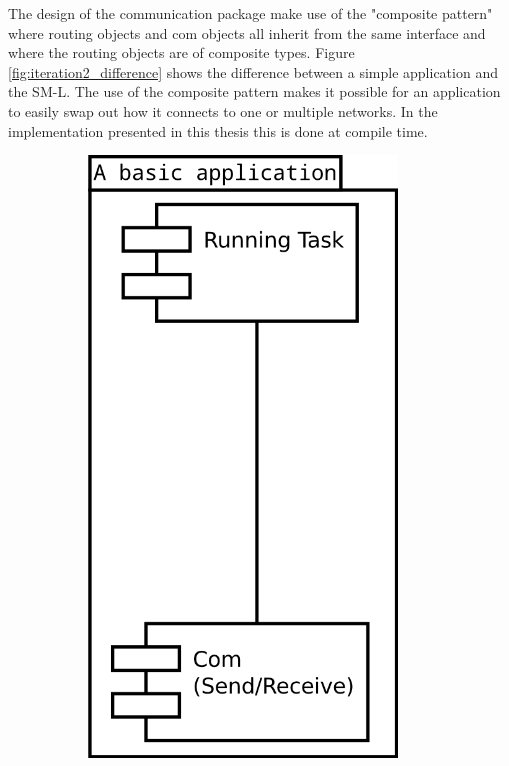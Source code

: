 The design of the communication package make use of the "composite
pattern" where routing objects and com objects all inherit from the same
interface and where the routing objects are of composite types. Figure
\ref{fig:iteration2_difference} shows the difference between a simple
application and the SM-L. The use of the composite pattern makes it possible
for an application to easily swap out how it connects to one or multiple
networks. In the implementation presented in this thesis this is done at
compile time.

\begin{figure}[h]
    \begin{subfigure}[b]{0.5\linewidth}
        \centering
            \includegraphics[width=0.9\textwidth]{figures/iteration2_uml_basic_application}

\end{subfigure}
\end{figure}
